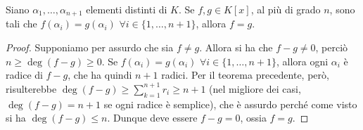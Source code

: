 \begin{corollario}  \label{c:principio-identita-polinomi}
	Siano $\alpha_1, \dots, \alpha_{n+1}$ elementi distinti di $K$.
	Se $f,g\in K[x]$, al più di grado $n$, sono tali che $f(\alpha_i)=g(\alpha_i)$ $\forall i\in\{1,\dots,n+1\}$, allora $f=g$.
\end{corollario}
\begin{proof}
	Supponiamo per assurdo che sia $f\ne g$.
	Allora si ha che $f-g\ne 0$, perciò $n\ge\deg (f-g)\ge 0$.
	Se $f(\alpha_i)=g(\alpha_i)$ $\forall i\in\{1,\dots,n+1\}$, allora ogni $\alpha_i$ è radice di $f-g$, che ha quindi $n+1$ radici.
	Per il teorema precedente, però, risulterebbe $\deg(f-g)\ge\sum_{k=1}^{n+1}r_i\ge n+1$ (nel migliore dei casi, $\deg(f-g)=n+1$ se ogni radice è semplice), che è assurdo perch\'e come visto si ha $\deg(f-g)\le n$.
	Dunque deve essere $f-g=0$, ossia $f=g$.
\end{proof}
